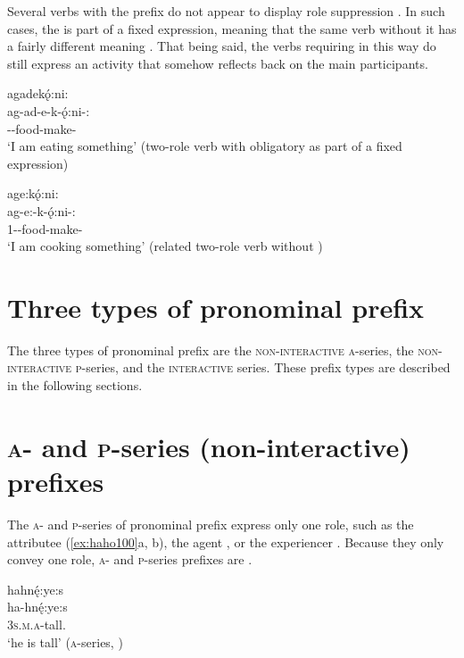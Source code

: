 Several verbs with the  {\semireflexive} prefix do not appear to display role suppression . In such cases, the  {\semireflexive} is part of a fixed expression, meaning that the same verb without it has a fairly different meaning . That being said, the verbs requiring  {\semireflexive} in this way do still express an activity that somehow reflects back on the main participants.

\ea\label{ex:groomex300}
\ea agadekǫ́:ni:\\\label{ex:groomex300a}
\gll ag-ad-e-k-ǫ́:ni-:\\
-{\joinerE}-food-make-{\stative}\\
\glt ‘I am eating something’ (two-role verb with obligatory {\semireflexive} as part of a fixed expression)

\ex age:kǫ́:ni:\\\label{ex:groomex300b}
\gll ag-e:-k-ǫ́:ni-:\\
{1\sgo}-{\joinerE}-food-make-{\stative}\\
\glt ‘I am cooking something’ (related two-role verb without {\semireflexive})
\z
\z



\section{Three types of pronominal prefix} \label{Three types of pronominal prefix}
The three types of pronominal prefix are the \textsc{non-interactive} \textsc{a}-series, the \textsc{non-interactive} \textsc{p}-series, and the \textsc{interactive} series. These prefix types are described in the following sections.

\section{\textsc{a}- and \textsc{p}-series (non-interactive) prefixes} \label{a and o (non-interactive) prefixes}
The \textsc{a}- and \textsc{p}-series of pronominal prefix express only one role, such as the attributee (\ref{ex:haho100}a, b), the agent , or the experiencer . Because they only convey one role, \textsc{a}- and \textsc{p}-series prefixes are .

\ea\label{ex:haho100}
\ea hahnę́:ye:s \\\label{ex:haho100a}
\gll ha-hnę́:ye:s\\
\textsc{3s.m.a}-tall.{\stative}\\
\glt ‘he is tall’ (\textsc{a}-series, )


